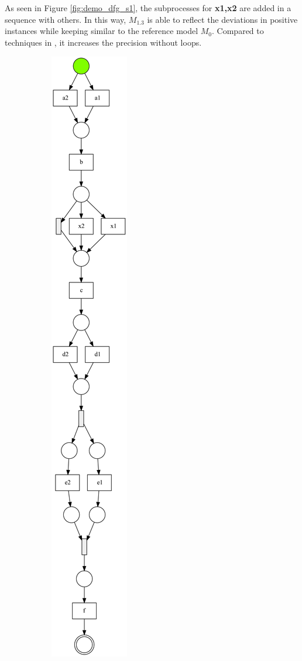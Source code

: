 As seen in Figure \ref{fig:demo_dfg_s1}, the subprocesses for \textbf{x1,x2} are added in a sequence with others. In this way, $M_{1.3}$ is able to reflect the deviations in positive instances while keeping similar to the reference model $M_0$. Compared to techniques in \cite{fahland2015model}, it increases the precision without loops.
\begin{figure}[htp]
	\centering
	\begin{subfigure}[b]{0.31\textwidth}
		\centering
		\includegraphics[width=0.75\linewidth, height=0.8\textheight]{figures/evaluation/PN-result-demo-s1-dfg.pdf}

\end{subfigure}
\end{figure}

